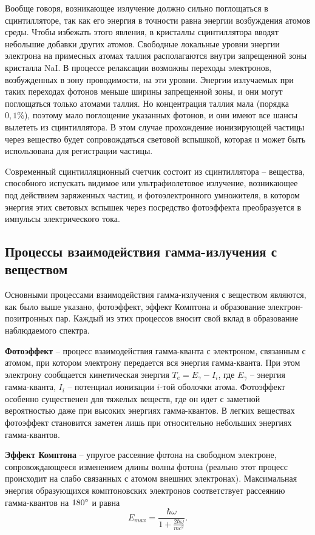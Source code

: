 \documentclass[a4paper,12pt]{article}
\begin{document}
Вообще говоря, возникающее излучение должно сильно поглощаться в сцинтилляторе, так как его энергия в точности равна энергии возбуждения атомов среды. Чтобы избежать этого явления, в кристаллы сцинтиллятора вводят небольшие добавки других атомов. Свободные локальные уровни энергии электрона на примесных атомах таллия располагаются внутри запрещенной зоны кристалла NaI. В процессе релаксации возможны переходы электронов, возбужденных в зону проводимости, на эти уровни. Энергии излучаемых при таких переходах фотонов меньше ширины запрещенной зоны, и они могут поглощаться только атомами таллия. Но концентрация таллия мала (порядка $0,1\%$), поэтому мало поглощение указанных фотонов, и они имеют все шансы вылететь из сцинтиллятора. В этом случае прохождение ионизирующей частицы через вещество будет сопровождаться световой вспышкой, которая и может быть использована для регистрации частицы.

Cовременный сцинтилляционный счетчик состоит из сцинтиллятора -- вещества, способного испускать видимое или ультрафиолетовое излучение, возникающее под действием заряженных частиц, и фотоэлектронного умножителя, в котором энергия этих световых вспышек через посредство фотоэффекта преобразуется в импульсы электрического тока.

\subsection{Процессы взаимодействия гамма-излучения с веществом}
Основными процессами взаимодействия гамма-излучения с веществом являются, как было выше указано, фотоэффект, эффект Комптона и образование электрон-позитронных пар. Каждый из этих процессов вносит свой вклад в образование наблюдаемого спектра.

\textbf{Фотоэффект} -- процесс взаимодействия гамма-кванта с электроном, связанным с атомом, при котором электрону передается вся энергия гамма-кванта. При этом электрону сообщается кинетическая энергия $T_e = E_\gamma - I_i$, где $E_\gamma$ -- энергия гамма-кванта, $I_i$ -- потенциал ионизации $i$-той оболочки атома. Фотоэффект особенно существенен для тяжелых веществ, где он идет с заметной вероятностью даже при высоких энергиях гамма-квантов. В легких
веществах фотоэффект становится заметен лишь при относительно небольших энергиях гамма-квантов.

\textbf{Эффект Комптона} -- упругое рассеяние фотона на свободном электроне,
сопровождающееся изменением длины волны фотона (реально этот процесс происходит на слабо связанных с атомом внешних электронах). Максимальная энергия образующихся комптоновских электронов соответствует рассеянию гамма-квантов на $180\degree$ и равна
\begin{equation}\label{eq: Compton E_max}
    E_{max} = \frac{\hbar \omega}{1 + \frac{2\hbar \omega}{mc^2}}.
\end{equation}
\end{document}
